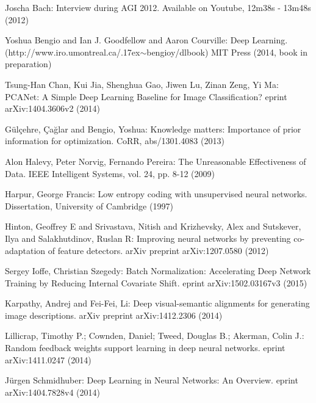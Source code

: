\documentclass[citeauthoryear]{llncs}
\begin{document}
%
%
\begin{thebibliography}{}
%
\newcommand{\mytilde}{\raise.17ex\hbox{$\scriptstyle\mathtt{\sim}$}}

Joscha Bach:
Interview during AGI 2012.
Available on Youtube, 12m38s - 13m48s (2012)

Yoshua Bengio and Ian J. Goodfellow and Aaron Courville:
Deep Learning.
(http://www.iro.umontreal.ca/\mytilde{}bengioy/dlbook)
MIT Press (2014, book in preparation)

Tsung-Han Chan, Kui Jia, Shenghua Gao, Jiwen Lu, Zinan Zeng, Yi Ma:
PCANet: A Simple Deep Learning Baseline for Image Classification?
eprint arXiv:1404.3606v2 (2014)

G{\"u}l{\c{c}}ehre, {\c{C}}a{\u{g}}lar and Bengio, Yoshua:
Knowledge matters: Importance of prior information for optimization.
CoRR, abs/1301.4083 (2013)

Alon Halevy, Peter Norvig, Fernando Pereira:
The Unreasonable Effectiveness of Data.
IEEE Intelligent Systems, vol. 24, pp. 8-12 (2009)

Harpur, George Francis: 
Low entropy coding with unsupervised neural networks.
Dissertation, University of Cambridge (1997)

Hinton, Geoffrey E and Srivastava, Nitish and Krizhevsky, Alex and Sutskever, Ilya and Salakhutdinov, Ruslan R:
Improving neural networks by preventing co-adaptation of feature detectors.
arXiv preprint arXiv:1207.0580 (2012)

Sergey Ioffe, Christian Szegedy:
Batch Normalization: Accelerating Deep Network Training by Reducing Internal Covariate Shift.
eprint arXiv:1502.03167v3 (2015)

Karpathy, Andrej and Fei-Fei, Li:
Deep visual-semantic alignments for generating image descriptions.
arXiv preprint arXiv:1412.2306 (2014)

Lillicrap, Timothy P.; Cownden, Daniel; Tweed, Douglas B.; Akerman, Colin J.:
Random feedback weights support learning in deep neural networks.
eprint arXiv:1411.0247 (2014)

J{\"u}rgen Schmidhuber:
Deep Learning in Neural Networks: An Overview.
eprint arXiv:1404.7828v4 (2014)


\end{thebibliography}
\end{document}
